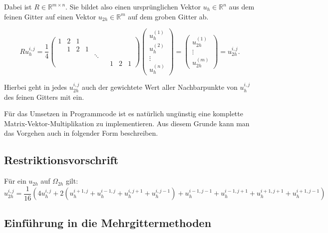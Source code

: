 Dabei ist $R \in \mathbb{R}^{m \times n}$. Sie bildet also einen ursprünglichen Vektor $u_{h} \in \mathbb{R}^{n}$ aus dem feinen Gitter auf einen Vektor $u_{2h} \in \mathbb{R}^{m}$ auf dem groben Gitter ab.

\begin{equation}
Ru^{i,j}_{h} = \frac {1} {4}
\begin{pmatrix}
1 & 2 & 1 & & & & & & \\
 & 1 & 2 & 1 & & & & & \\
 &&&&\ddots&&&& \\
 & & & & & & 1 & 2 & 1
\end{pmatrix}
\begin{pmatrix}
u_{h}^{(1)} \\
u_{h}^{(2)} \\
\vdots \\
u_{h}^{(n)}
\end{pmatrix} =
\begin{pmatrix}
u_{2h}^{(1)} \\
\vdots \\
u_{2h}^{(m)}
\end{pmatrix} =
u^{i,j}_{2h}.
\end{equation}

Hierbei geht in jedes $u^{i,j}_{2h}$ auch der gewichtete Wert aller Nachbarpunkte von $u^{i,j}_{h}$ des feinen Gitters mit ein.


Für das Umsetzen in Programmcode ist es natürlich ungünstig eine komplette Matrix-Vektor-Multiplikation zu implementieren. Aus diesem Grunde kann man das Vorgehen auch in folgender Form beschreiben.

\subsection{Restriktionsvorschrift}

Für ein $u_{2h}$ auf $\Omega_{2h}$ gilt:
\begin{equation}
u_{2h}^{i,j} = \frac {1} {16} (4u_{h}^{i,j}+2(u_{h}^{i+1,j}+u_{h}^{i-1,j}+u_{h}^{i,j+1}+u_{h}^{i,j-1})+u_{h}^{i-1,j-1}+u_{h}^{i-1,j+1}+u_{h}^{i+1,j+1}+u_{h}^{i+1,j-1})
\end{equation}

\subsection{Einführung in die Mehrgittermethoden}

